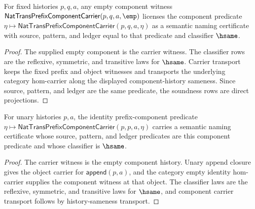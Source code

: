 \begin{theorem}
\label{thm:nattrans-prefix-component-carrier-empty-component-semantic-namecert}
For fixed histories $p,q,a$, any empty component witness
$\mathsf{NatTransPrefixComponentCarrier}(p,q,a,\emp)$ licenses the component
predicate
$\eta\mapsto\mathsf{NatTransPrefixComponentCarrier}(p,q,a,\eta)$ as a
semantic naming certificate with source, pattern, and ledger equal to that
predicate and classifier $\hsame$.
\end{theorem}
\begin{proof}
The supplied empty component is the carrier witness. The classifier rows are
the reflexive, symmetric, and transitive laws for $\hsame$. Carrier transport
keeps the fixed prefix and object witnesses and transports the underlying
category hom-carrier along the displayed component-history sameness. Since
source, pattern, and ledger are the same predicate, the soundness rows are
direct projections.
\end{proof}

\begin{theorem}
\label{thm:nattrans-prefix-component-identity-semantic-namecert}
For unary histories $p,a$, the identity prefix-component predicate
$\eta\mapsto\mathsf{NatTransPrefixComponentCarrier}(p,p,a,\eta)$ carries a
semantic naming certificate whose source, pattern, and ledger predicates are
this component predicate and whose classifier is $\hsame$.
\end{theorem}
\begin{proof}
The carrier witness is the empty component history. Unary append closure gives
the object carrier for $\mathsf{append}(p,a)$, and the category empty identity
hom-carrier supplies the component witness at that object. The classifier laws
are the reflexive, symmetric, and transitive laws for $\hsame$, and component
carrier transport follows by history-sameness transport.
\end{proof}
